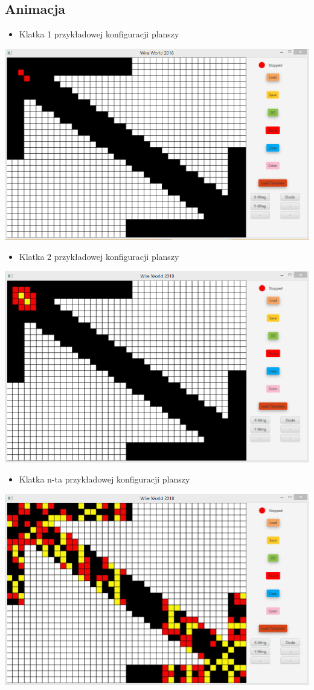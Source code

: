 \documentclass[a4paper,11pt]{article}
\begin{document}
\subsection{Animacja}
\begin{itemize}
\item Klatka 1 przykładowej konfiguracji planszy
\end{itemize}
\includegraphics[width=\textwidth]{GenFrame1}
\begin{itemize}
\item Klatka 2 przykładowej konfiguracji planszy
\end{itemize}
\includegraphics[width=\textwidth]{GenFrame2}
\begin{itemize}
\item Klatka n-ta przykładowej konfiguracji planszy
\end{itemize}
\includegraphics[width=\textwidth]{GenFrame69}
\end{document}
